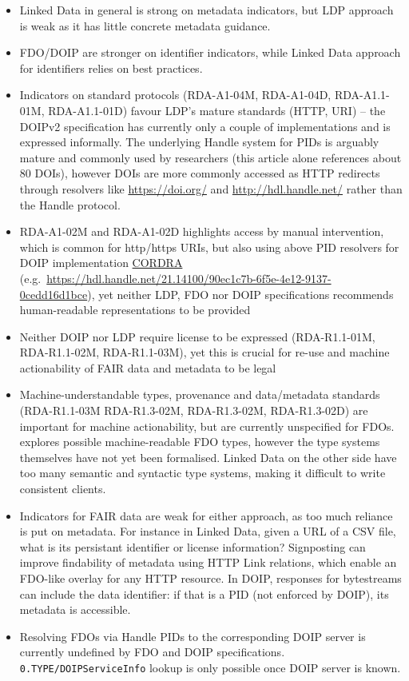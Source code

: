 \documentclass[fleqn,10pt,lineno]{wlpeerjlua}
\providecommand{\tightlist}{%
  \setlength{\itemsep}{0pt}\setlength{\parskip}{0pt}}
\begin{document}
\begin{itemize}
\tightlist
\item
  Linked Data in general is strong on metadata indicators, but LDP approach is weak as it has little concrete metadata guidance.
\item
  FDO/DOIP are stronger on identifier indicators, while Linked Data approach for identifiers relies on best practices. 
\item
  Indicators on standard protocols (RDA-A1-04M, RDA-A1-04D, RDA-A1.1-01M, RDA-A1.1-01D) favour LDP's mature standards (HTTP, URI) -- the DOIPv2 specification \autocite{foundationDigitalObjectInterface} has currently only a couple of implementations and is expressed informally. The underlying Handle system for PIDs is arguably mature and commonly used by researchers (this article alone references about 80 DOIs), however DOIs are more commonly accessed as HTTP redirects through resolvers like \url{https://doi.org/} and \url{http://hdl.handle.net/} rather than the Handle protocol.
\item
  RDA-A1-02M and RDA-A1-02D highlights access by manual intervention, which is common for http/https URIs, but also using above PID resolvers for DOIP implementation \href{https://www.cordra.org/}{CORDRA} (e.g.~\url{https://hdl.handle.net/21.14100/90ec1c7b-6f5e-4e12-9137-0cedd16d1bce}), yet neither LDP, FDO nor DOIP specifications recommends human-readable representations to be provided
\item
  Neither DOIP nor LDP require license to be expressed (RDA-R1.1-01M, RDA-R1.1-02M, RDA-R1.1-03M), yet this is crucial for re-use and machine actionability of FAIR data and metadata to be legal
\item
  Machine-understandable types, provenance and data/metadata standards (RDA-R1.1-03M RDA-R1.3-02M, RDA-R1.3-02M, RDA-R1.3-02D) are important for machine actionability, but are currently unspecified for FDOs. \autocite{fdo-ImplAttributesTypesProfiles} explores possible machine-readable FDO types, however the type systems themselves have not yet been formalised. Linked Data on the other side have too many semantic and syntactic type systems, making it difficult to write consistent clients.
\item
  Indicators for FAIR data are weak for either approach, as too much reliance is put on metadata. For instance in Linked Data, given a URL of a CSV file, what is its persistant identifier or license information? Signposting \autocite{vandesompel2015} can improve findability of metadata using HTTP Link relations, which enable an FDO-like overlay for any HTTP resource. In DOIP, responses for bytestreams can include the data identifier: if that is a PID (not enforced by DOIP), its metadata is accessible.
\item
  Resolving FDOs via Handle PIDs to the corresponding DOIP server is currently undefined by FDO and DOIP specifications. \texttt{0.TYPE/DOIPServiceInfo} lookup is only possible once DOIP server is known.
\end{itemize}
\end{document}
